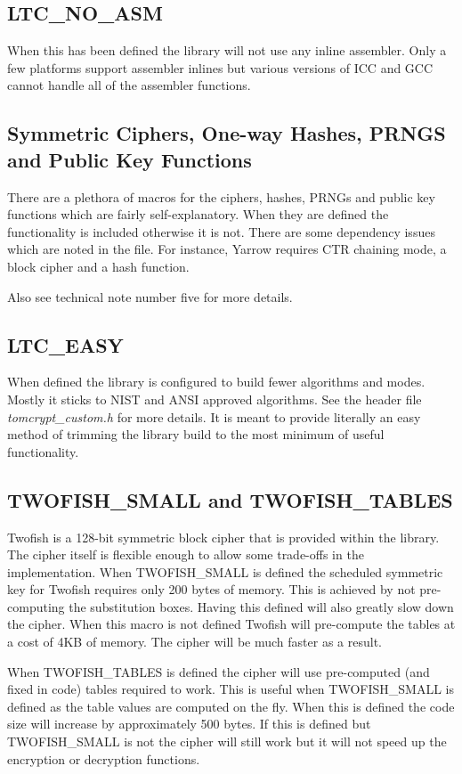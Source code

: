 \documentclass[synpaper]{book}
\begin{document}
\subsection{LTC\_NO\_ASM}
When this has been defined the library will not use any inline assembler.  Only a few platforms support assembler inlines but various versions of ICC and GCC
cannot handle all of the assembler functions.

\subsection{Symmetric Ciphers, One-way Hashes, PRNGS and Public Key Functions}
There are a plethora of macros for the ciphers, hashes, PRNGs and public key functions which are fairly
self-explanatory.  When they are defined the functionality is included otherwise it is not.  There are some
dependency issues which are noted in the file.  For instance, Yarrow requires CTR chaining mode, a block
cipher and a hash function.

Also see technical note number five for more details.

\subsection{LTC\_EASY}
When defined the library is configured to build fewer algorithms and modes.  Mostly it sticks to NIST and ANSI approved algorithms.  See
the header file \textit{tomcrypt\_custom.h} for more details.  It is meant to provide literally an easy method of trimming the library
build to the most minimum of useful functionality.

\subsection{TWOFISH\_SMALL and TWOFISH\_TABLES}
Twofish is a 128-bit symmetric block cipher that is provided within the library.  The cipher itself is flexible enough
to allow some trade-offs in the implementation.  When TWOFISH\_SMALL is defined the scheduled symmetric key for Twofish
requires only 200 bytes of memory.  This is achieved by not pre-computing the substitution boxes.  Having this
defined will also greatly slow down the cipher.  When this macro is not defined Twofish will pre-compute the
tables at a cost of 4KB of memory.  The cipher will be much faster as a result.

When TWOFISH\_TABLES is defined the cipher will use pre-computed (and fixed in code) tables required to work.  This is
useful when TWOFISH\_SMALL is defined as the table values are computed on the fly.  When this is defined the code size
will increase by approximately 500 bytes.  If this is defined but TWOFISH\_SMALL is not the cipher will still work but
it will not speed up the encryption or decryption functions.
\end{document}
